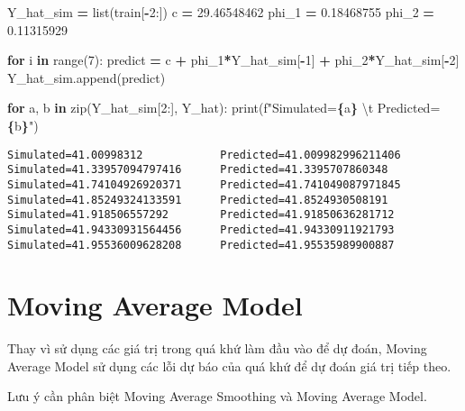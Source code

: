 \documentclass[
]{book}
\newenvironment{Shaded}{\begin{snugshade}}{\end{snugshade}}
\newcommand{\BuiltInTok}[1]{#1}
\newcommand{\CharTok}[1]{\textcolor[rgb]{0.31,0.60,0.02}{#1}}
\newcommand{\ControlFlowTok}[1]{\textcolor[rgb]{0.13,0.29,0.53}{\textbf{#1}}}
\newcommand{\DecValTok}[1]{\textcolor[rgb]{0.00,0.00,0.81}{#1}}
\newcommand{\FloatTok}[1]{\textcolor[rgb]{0.00,0.00,0.81}{#1}}
\newcommand{\KeywordTok}[1]{\textcolor[rgb]{0.13,0.29,0.53}{\textbf{#1}}}
\newcommand{\NormalTok}[1]{#1}
\newcommand{\OperatorTok}[1]{\textcolor[rgb]{0.81,0.36,0.00}{\textbf{#1}}}
\newcommand{\SpecialCharTok}[1]{\textcolor[rgb]{0.81,0.36,0.00}{\textbf{#1}}}
\newcommand{\SpecialStringTok}[1]{\textcolor[rgb]{0.31,0.60,0.02}{#1}}
\begin{document}
\begin{Shaded}
\begin{Highlighting}[]
\NormalTok{Y\_hat\_sim }\OperatorTok{=} \BuiltInTok{list}\NormalTok{(train[}\OperatorTok{{-}}\DecValTok{2}\NormalTok{:])}
\NormalTok{c }\OperatorTok{=} \FloatTok{29.46548462}
\NormalTok{phi\_1 }\OperatorTok{=} \FloatTok{0.18468755}
\NormalTok{phi\_2 }\OperatorTok{=} \FloatTok{0.11315929}

\ControlFlowTok{for}\NormalTok{ i }\KeywordTok{in} \BuiltInTok{range}\NormalTok{(}\DecValTok{7}\NormalTok{):}
\NormalTok{    predict }\OperatorTok{=}\NormalTok{ c }\OperatorTok{+}\NormalTok{ phi\_1}\OperatorTok{*}\NormalTok{Y\_hat\_sim[}\OperatorTok{{-}}\DecValTok{1}\NormalTok{] }\OperatorTok{+}\NormalTok{ phi\_2}\OperatorTok{*}\NormalTok{Y\_hat\_sim[}\OperatorTok{{-}}\DecValTok{2}\NormalTok{]}
\NormalTok{    Y\_hat\_sim.append(predict)}

\ControlFlowTok{for}\NormalTok{ a, b }\KeywordTok{in} \BuiltInTok{zip}\NormalTok{(Y\_hat\_sim[}\DecValTok{2}\NormalTok{:], Y\_hat):}
    \BuiltInTok{print}\NormalTok{(}\SpecialStringTok{f"Simulated=}\SpecialCharTok{\{}\NormalTok{a}\SpecialCharTok{\}}\SpecialStringTok{ }\CharTok{\textbackslash{}t}\SpecialStringTok{ Predicted=}\SpecialCharTok{\{}\NormalTok{b}\SpecialCharTok{\}}\SpecialStringTok{"}\NormalTok{)}
\end{Highlighting}
\end{Shaded}

\begin{verbatim}
Simulated=41.00998312            Predicted=41.009982996211406
Simulated=41.33957094797416      Predicted=41.3395707860348
Simulated=41.74104926920371      Predicted=41.741049087971845
Simulated=41.85249324133591      Predicted=41.8524930508191
Simulated=41.918506557292        Predicted=41.91850636281712
Simulated=41.94330931564456      Predicted=41.94330911921793
Simulated=41.95536009628208      Predicted=41.95535989900887
\end{verbatim}

\hypertarget{moving-average-model}{%
\section{Moving Average Model}\label{moving-average-model}}

Thay vì sử dụng các giá trị trong quá khứ làm đầu vào để dự đoán, Moving Average Model sử dụng các lỗi dự báo của quá khứ để dự đoán giá trị tiếp theo.

Lưu ý cần phân biệt Moving Average Smoothing và Moving Average Model.
\end{document}
